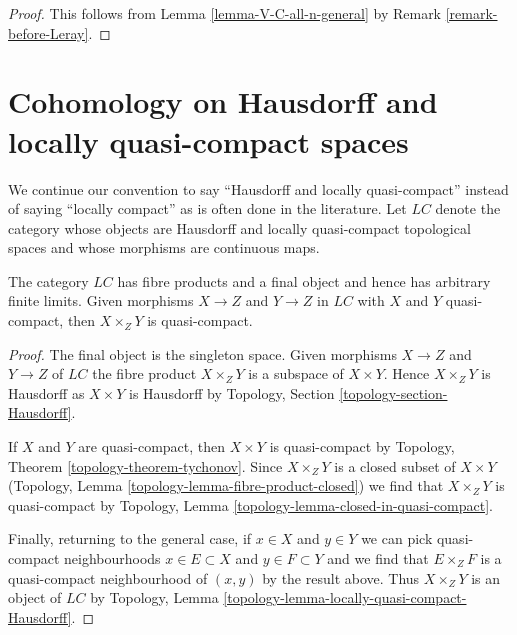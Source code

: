\begin{proof}
This follows from Lemma \ref{lemma-V-C-all-n-general}
by Remark \ref{remark-before-Leray}.
\end{proof}
























\section{Cohomology on Hausdorff and locally quasi-compact spaces}
\label{section-cohomology-LC}

\noindent
We continue our convention to say ``Hausdorff and locally quasi-compact''
instead of saying ``locally compact'' as is often done in the literature.
Let $\textit{LC}$ denote the category whose objects are Hausdorff and
locally quasi-compact topological spaces and whose morphisms are continuous
maps.

\begin{lemma}
\label{lemma-LC-basic}
The category $\textit{LC}$ has fibre products and a final object and hence
has arbitrary finite limits. Given morphisms $X \to Z$ and $Y \to Z$
in $\textit{LC}$ with
$X$ and $Y$ quasi-compact, then $X \times_Z Y$ is quasi-compact.
\end{lemma}

\begin{proof}
The final object is the singleton space. Given morphisms $X \to Z$ and
$Y \to Z$ of $\textit{LC}$ the fibre product $X \times_Z Y$ is
a subspace of $X \times Y$. Hence $X \times_Z Y$ is Hausdorff as
$X \times Y$ is Hausdorff by
Topology, Section \ref{topology-section-Hausdorff}.

\medskip\noindent
If $X$ and $Y$ are quasi-compact, then $X \times Y$ is quasi-compact by 
Topology, Theorem \ref{topology-theorem-tychonov}.
Since $X \times_Z Y$ is a closed subset of $X \times Y$
(Topology, Lemma \ref{topology-lemma-fibre-product-closed})
we find that $X \times_Z Y$ is quasi-compact by
Topology, Lemma \ref{topology-lemma-closed-in-quasi-compact}.

\medskip\noindent
Finally, returning to the general case, if $x \in X$ and $y \in Y$
we can pick quasi-compact neighbourhoods $x \in E \subset X$ and
$y \in F \subset Y$ and we find that $E \times_Z F$ is a quasi-compact
neighbourhood of $(x, y)$ by the result above. Thus $X \times_Z Y$
is an object of $\textit{LC}$ by
Topology, Lemma \ref{topology-lemma-locally-quasi-compact-Hausdorff}.
\end{proof}

